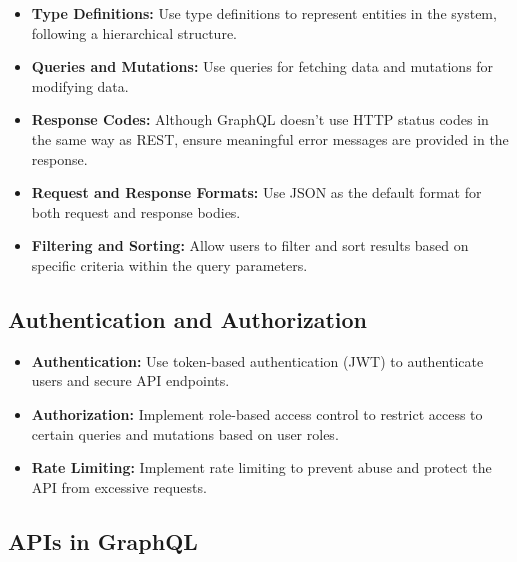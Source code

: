\begin{itemize}
\item \textbf{Type Definitions:} Use type definitions to represent entities in the system, following a hierarchical structure.
\item \textbf{Queries and Mutations:} Use queries for fetching data and mutations for modifying data.
\item \textbf{Response Codes:} Although GraphQL doesn't use HTTP status codes in the same way as REST, ensure meaningful error messages are provided in the response.
\item \textbf{Request and Response Formats:} Use JSON as the default format for both request and response bodies.
\item \textbf{Filtering and Sorting:} Allow users to filter and sort results based on specific criteria within the query parameters.
\end{itemize}

\subsection{Authentication and Authorization}

\begin{itemize}
\item \textbf{Authentication:} Use token-based authentication (JWT) to authenticate users and secure API endpoints.
\item \textbf{Authorization:} Implement role-based access control to restrict access to certain queries and mutations based on user roles.
\item \textbf{Rate Limiting:} Implement rate limiting to prevent abuse and protect the API from excessive requests.
\end{itemize}

\subsection{APIs in GraphQL}
